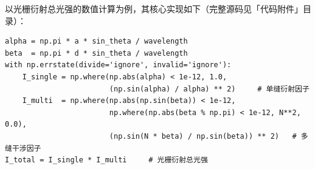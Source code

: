\documentclass[12pt,a4paper]{ctexrep}
\begin{document}
以光栅衍射总光强的数值计算为例，其核心实现如下（完整源码见「代码附件」目录）：

\begin{lstlisting}[style=pycode]
alpha = np.pi * a * sin_theta / wavelength
beta  = np.pi * d * sin_theta / wavelength
with np.errstate(divide='ignore', invalid='ignore'):
    I_single = np.where(np.abs(alpha) < 1e-12, 1.0,
                        (np.sin(alpha) / alpha) ** 2)     # 单缝衍射因子
    I_multi  = np.where(np.abs(np.sin(beta)) < 1e-12,
                        np.where(np.abs(beta % np.pi) < 1e-12, N**2, 0.0),
                        (np.sin(N * beta) / np.sin(beta)) ** 2)   # 多缝干涉因子
I_total = I_single * I_multi     # 光栅衍射总光强
\end{lstlisting}
\end{document}
